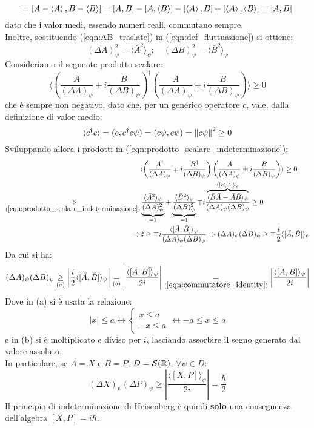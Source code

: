 \documentclass[../../FisicaTeorica.tex]{subfiles}
\begin{document}
\begin{equation}
[\bar{A},\bar{B}]=[A-\avg{A},B-\avg{B}]=[A,B]-[A,\avg{B}]-[\avg{A},B]+[\avg{A},\avg{B}]=[A,B]
\label{eqn:commutatore_identity}
\end{equation}
dato che i valor medi, essendo numeri reali, commutano sempre.\\
Inoltre, sostituendo (\ref{eqn:AB_traslate}) in (\ref{eqn:def_fluttuazione}) si ottiene:
\begin{equation}
(\Delta A)^2_\psi = \langle \bar{A}^2 \rangle_\psi; \quad (\Delta B)^2_\psi = \langle \bar{B}^2 \rangle_\psi
\label{eqn:prodotto_scalare_indeterminazione}
\end{equation}
Consideriamo il seguente prodotto scalare:
\[
\langle \left(\frac{\bar{A}}{(\Delta A)_\psi}\pm i \frac{\bar{B}}{(\Delta B)_\psi} \right)^\dag \left ( \frac{\bar{A}}{(\Delta A)_\psi}\pm i \frac{\bar{B}}{(\Delta B)_\psi }\right ) \rangle \geq 0
\]
che è sempre non negativo, dato che, per un generico operatore $c$, vale, dalla definizione di valor medio:
\[
\langle c^\dag c\rangle= (c,c^\dag c \psi)=( c\psi, c\psi ) =\left\lVert c\psi\right\rVert^2 \geq 0
\]
Sviluppando allora i prodotti in (\ref{eqn:prodotto_scalare_indeterminazione}):
\begin{align*}
&\langle \left( \frac{\bar{A}^\dag}{(\Delta A)_\psi}\mp i \frac{\bar{B}^\dag}{(\Delta B)_\psi}\right)\left(\frac{\bar{A}}{(\Delta A)_\psi} \pm i \frac{\bar{B}}{(\Delta B)_\psi}\right)\rangle \geq 0\\
\underset{(\ref{eqn:prodotto_scalare_indeterminazione})}{\Rightarrow} & \underbrace{\frac{\langle \bar{A}^2 \rangle_\psi}{(\Delta A)^2_\psi}}_{=1} +
\underbrace{\frac{\langle \bar{B}^2\rangle_\psi}{(\Delta B)^2_\psi}}_{=1} \mp i \frac{\overbrace{\langle \bar{B}\bar{A}-\bar{A}\bar{B}\rangle_\psi}^{\langle[\bar{B},\bar{A}]\rangle_\psi}}{(\Delta A)_\psi (\Delta B)_\psi}\geq 0\\
\Rightarrow &2 \geq\mp i\frac{\langle [\bar{A},\bar{B}]\rangle_\psi}{(\Delta A)_\psi (\Delta B)_\psi} \Rightarrow (\Delta A)_\psi(\Delta B)_\psi\geq\mp\frac{i}{2}\langle [\bar{A},\bar{B}]\rangle_\psi
\end{align*}
Da cui si ha:
\[
(\Delta A)_\psi(\Delta B)_\psi \underset{(a)}{\geq} \left|\frac{i}{2}\langle[\bar{A},\bar{B}]\rangle_\psi\right|\underset{(b)}{=}\left |\frac{\langle[\bar{A},\bar{B]\rangle_\psi}}{2i}\right|\underset{(\ref{eqn:commutatore_identity})}{=}
\left |\frac{\langle [A,B]\rangle_\psi}{2i} \right |
\]
Dove in (a) si è usata la relazione:
\[
|x|\leq a \leftrightarrow \begin{cases}
x \leq a\\
-x \leq a
\end{cases} \leftrightarrow -a \leq x \leq a
\]
e in (b) si è moltiplicato e diviso per $i$, lasciando assorbire il segno generato dal valore assoluto.\\
In particolare, se $A=X$ e $B=P$, $D=\mathcal{S}(\mathbb{R})$, $\forall \psi \in D$:
\[
(\Delta X)_\psi (\Delta P)_\psi \geq \left | 
\frac{\langle [X,P]\rangle_\psi}{2i}
\right | = \frac{\hbar}{2}
\]
Il principio di indeterminazione di Heisenberg è quindi \textbf{solo} una conseguenza dell'algebra $[X,P]=i\hbar$.
\end{document}
